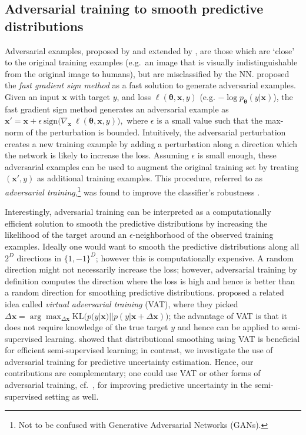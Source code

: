 \documentclass{article}
\newcommand{\bx}{\mathbf{x}}
\newcommand{\deltax}{\Delta{\bx}}
\newcommand{\btheta}{\mathbf{\theta}}
\newcommand{\sign}{\mathrm{sign}}
\newcommand{\KL}{\mathrm{KL}}
\begin{document}
\subsection{Adversarial training to smooth predictive distributions}
Adversarial examples, proposed by \citet{intriguing} and extended by \citet{adversarial}, are those which are `close' to the original training examples (e.g.~an image that is visually indistinguishable from the original image to humans), but are misclassified by the NN.
\citet{adversarial} proposed the \emph{fast gradient sign method} as a fast solution to generate adversarial examples.
Given an input $\bx$ with target $y$, and loss $\ell(\btheta,\bx,y)$ (e.g. $-\log p_\btheta(y|\bx)$), the fast gradient sign method generates an adversarial example as
$\bx' = \bx + \epsilon\  \sign \bigl( \nabla_{\bx} \ \ell(\btheta,\bx,y) \bigr),$ 
where %
$\epsilon$ is a small value %
 such that the max-norm of the perturbation is bounded. 
Intuitively, the adversarial perturbation creates a new training example by adding a perturbation along a direction which the network is likely to increase the loss. Assuming $\epsilon$ is small enough, these adversarial examples can be used to  augment the original training set by treating $(\bx', y)$ %
as additional training examples.
This procedure, referred to as \emph{adversarial training},\footnote{Not to be confused with Generative Adversarial Networks (GANs).} 
was found to improve the classifier's robustness \citep{adversarial}. %

Interestingly, adversarial training can be interpreted as a computationally efficient solution  to smooth the predictive distributions by increasing the likelihood of the target around an $\epsilon$-neighborhood of the observed training examples. Ideally one would want to smooth the predictive distributions along all $2^D$ directions in $\{1,-1\}^D$; however this is computationally expensive. A random direction might not necessarily increase the loss; however, adversarial training by definition computes the direction where the loss is high and hence is better than a random direction for smoothing predictive distributions. \citet{vat} proposed a related idea called 
  \emph{virtual adversarial training} (VAT), where they picked $\deltax = \arg\max_{\deltax} \KL\bigl(p(y|\bx)||p(y|\bx+\deltax) \bigr)$; the advantage of VAT is that it does not require knowledge of the true target $y$ and hence can be applied to semi-supervised learning.  \citet{vat} showed that distributional smoothing using VAT is beneficial for efficient semi-supervised learning; in contrast, we investigate the use of  adversarial training for predictive uncertainty estimation. Hence, our contributions are complementary; one could use VAT or other forms of adversarial training,  cf.~\citep{kurakin2016adversarial}, 
  for improving predictive uncertainty in the semi-supervised setting as well. %
\end{document}

